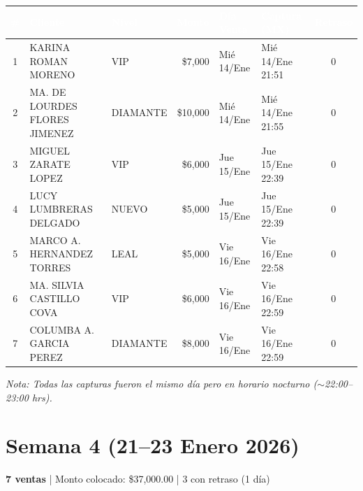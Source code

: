 \documentclass[11pt,a4paper]{article}
\begin{document}
\vspace{0.3cm}
\begin{center}
\renewcommand{\arraystretch}{1.3}
\footnotesize
\begin{tabular}{|c|l|l|r|l|l|c|}
\hline
\rowcolor{headerblue}
\textcolor{white}{\textbf{\#}} &
\textcolor{white}{\textbf{Cliente}} &
\textcolor{white}{\textbf{Nivel}} &
\textcolor{white}{\textbf{Monto}} &
\textcolor{white}{\textbf{D\'ia Venta}} &
\textcolor{white}{\textbf{Captura (MX)}} &
\textcolor{white}{\textbf{Retraso}} \\
\hline
1 & KARINA ROMAN MORENO & VIP & \$7,000 & Mi\'e 14/Ene & Mi\'e 14/Ene 21:51 & 0 \\
\hline
\rowcolor{lightgray}
2 & MA. DE LOURDES FLORES JIMENEZ & DIAMANTE & \$10,000 & Mi\'e 14/Ene & Mi\'e 14/Ene 21:55 & 0 \\
\hline
3 & MIGUEL ZARATE LOPEZ & VIP & \$6,000 & Jue 15/Ene & Jue 15/Ene 22:39 & 0 \\
\hline
\rowcolor{lightgray}
4 & LUCY LUMBRERAS DELGADO & NUEVO & \$5,000 & Jue 15/Ene & Jue 15/Ene 22:39 & 0 \\
\hline
5 & MARCO A. HERNANDEZ TORRES & LEAL & \$5,000 & Vie 16/Ene & Vie 16/Ene 22:58 & 0 \\
\hline
\rowcolor{lightgray}
6 & MA. SILVIA CASTILLO COVA & VIP & \$6,000 & Vie 16/Ene & Vie 16/Ene 22:59 & 0 \\
\hline
7 & COLUMBA A. GARCIA PEREZ & DIAMANTE & \$8,000 & Vie 16/Ene & Vie 16/Ene 22:59 & 0 \\
\hline
\end{tabular}
\end{center}

\vspace{0.2cm}
\textit{Nota: Todas las capturas fueron el mismo d\'ia pero en horario nocturno ($\sim$22:00--23:00 hrs).}

\section*{\textcolor{headerblue}{Semana 4 (21--23 Enero 2026)}}
\textbf{7 ventas} | Monto colocado: \$37,000.00 | \textcolor{warningyellow}{3 con retraso (1 d\'ia)}
\end{document}
